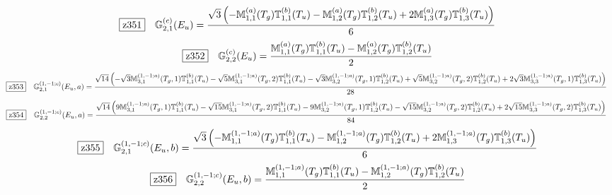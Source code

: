 \documentclass[fleqn,10pt,landscape]{jsarticle}
\begin{document}
\begin{dmath*}
\hspace*{3mm}\fbox{z351}\quad \mathbb{G}_{2,1}^{(c)}(E_{u})=\frac{\sqrt{3} \left(- \mathbb{M}_{1,1}^{(a)}(T_{g}) \mathbb{T}_{1,1}^{(b)}(T_{u}) - \mathbb{M}_{1,2}^{(a)}(T_{g}) \mathbb{T}_{1,2}^{(b)}(T_{u}) + 2 \mathbb{M}_{1,3}^{(a)}(T_{g}) \mathbb{T}_{1,3}^{(b)}(T_{u})\right)}{6}
\end{dmath*}
\begin{dmath*}
\hspace*{3mm}\fbox{z352}\quad \mathbb{G}_{2,2}^{(c)}(E_{u})=\frac{\mathbb{M}_{1,1}^{(a)}(T_{g}) \mathbb{T}_{1,1}^{(b)}(T_{u}) - \mathbb{M}_{1,2}^{(a)}(T_{g}) \mathbb{T}_{1,2}^{(b)}(T_{u})}{2}
\end{dmath*}
\begin{dmath*}
\hspace*{3mm}\fbox{z353}\quad \mathbb{G}_{2,1}^{(1,-1;c)}(E_{u},a)=\frac{\sqrt{14} \left(- \sqrt{3} \mathbb{M}_{3,1}^{(1,-1;a)}(T_{g},1) \mathbb{T}_{1,1}^{(b)}(T_{u}) - \sqrt{5} \mathbb{M}_{3,1}^{(1,-1;a)}(T_{g},2) \mathbb{T}_{1,1}^{(b)}(T_{u}) - \sqrt{3} \mathbb{M}_{3,2}^{(1,-1;a)}(T_{g},1) \mathbb{T}_{1,2}^{(b)}(T_{u}) + \sqrt{5} \mathbb{M}_{3,2}^{(1,-1;a)}(T_{g},2) \mathbb{T}_{1,2}^{(b)}(T_{u}) + 2 \sqrt{3} \mathbb{M}_{3,3}^{(1,-1;a)}(T_{g},1) \mathbb{T}_{1,3}^{(b)}(T_{u})\right)}{28}
\end{dmath*}
\begin{dmath*}
\hspace*{3mm}\fbox{z354}\quad \mathbb{G}_{2,2}^{(1,-1;c)}(E_{u},a)=\frac{\sqrt{14} \left(9 \mathbb{M}_{3,1}^{(1,-1;a)}(T_{g},1) \mathbb{T}_{1,1}^{(b)}(T_{u}) - \sqrt{15} \mathbb{M}_{3,1}^{(1,-1;a)}(T_{g},2) \mathbb{T}_{1,1}^{(b)}(T_{u}) - 9 \mathbb{M}_{3,2}^{(1,-1;a)}(T_{g},1) \mathbb{T}_{1,2}^{(b)}(T_{u}) - \sqrt{15} \mathbb{M}_{3,2}^{(1,-1;a)}(T_{g},2) \mathbb{T}_{1,2}^{(b)}(T_{u}) + 2 \sqrt{15} \mathbb{M}_{3,3}^{(1,-1;a)}(T_{g},2) \mathbb{T}_{1,3}^{(b)}(T_{u})\right)}{84}
\end{dmath*}
\begin{dmath*}
\hspace*{3mm}\fbox{z355}\quad \mathbb{G}_{2,1}^{(1,-1;c)}(E_{u},b)=\frac{\sqrt{3} \left(- \mathbb{M}_{1,1}^{(1,-1;a)}(T_{g}) \mathbb{T}_{1,1}^{(b)}(T_{u}) - \mathbb{M}_{1,2}^{(1,-1;a)}(T_{g}) \mathbb{T}_{1,2}^{(b)}(T_{u}) + 2 \mathbb{M}_{1,3}^{(1,-1;a)}(T_{g}) \mathbb{T}_{1,3}^{(b)}(T_{u})\right)}{6}
\end{dmath*}
\begin{dmath*}
\hspace*{3mm}\fbox{z356}\quad \mathbb{G}_{2,2}^{(1,-1;c)}(E_{u},b)=\frac{\mathbb{M}_{1,1}^{(1,-1;a)}(T_{g}) \mathbb{T}_{1,1}^{(b)}(T_{u}) - \mathbb{M}_{1,2}^{(1,-1;a)}(T_{g}) \mathbb{T}_{1,2}^{(b)}(T_{u})}{2}
\end{dmath*}
\end{document}
